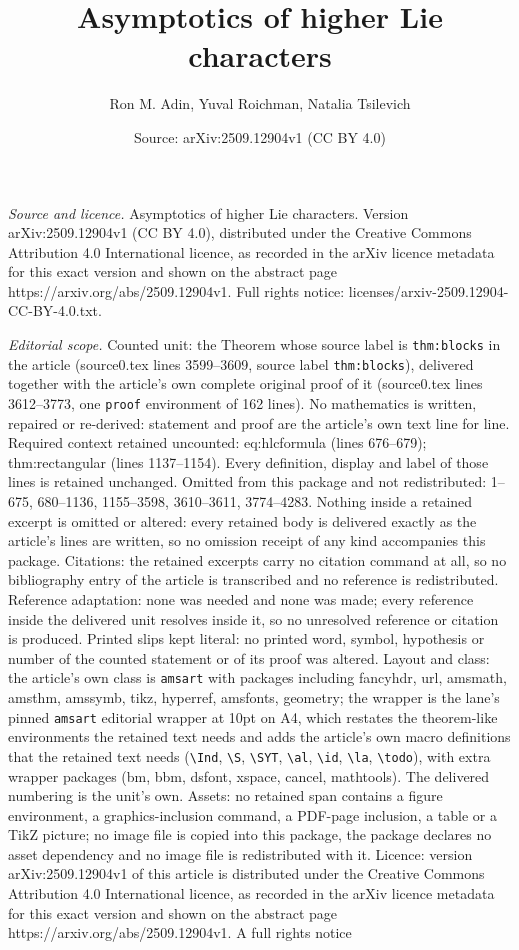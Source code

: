 \documentclass[10pt,a4paper]{amsart}
\title[Asymptotics of higher Lie characters]{Asymptotics of higher Lie characters}
\author{Ron M. Adin, Yuval Roichman, Natalia Tsilevich}
\date{Source: arXiv:2509.12904v1 (CC BY 4.0)}
\begin{document}
\maketitle

\noindent\emph{Source and licence.} Asymptotics of higher Lie characters. Version arXiv:2509.12904v1 (CC BY 4.0), distributed under the Creative Commons Attribution 4.0 International licence, as recorded in the arXiv licence metadata for this exact version and shown on the abstract page https://arxiv.org/abs/2509.12904v1. Full rights notice: licenses/arxiv-2509.12904-CC-BY-4.0.txt.\par\smallskip

\noindent\textit{Editorial scope.} Counted unit: the Theorem whose source label is \texttt{thm:blocks} in the article (source0.tex lines 3599--3609, source label \texttt{thm:blocks}), delivered together with the article's own complete original proof of it (source0.tex lines 3612--3773, one \texttt{proof} environment of 162 lines). No mathematics is written, repaired or re-derived: statement and proof are the article's own text line for line. Required context retained uncounted: eq:hlcformula (lines 676--679); thm:rectangular (lines 1137--1154). Every definition, display and label of those lines is retained unchanged. Omitted from this package and not redistributed: 1--675, 680--1136, 1155--3598, 3610--3611, 3774--4283. Nothing inside a retained excerpt is omitted or altered: every retained body is delivered exactly as the article's lines are written, so no omission receipt of any kind accompanies this package. Citations: the retained excerpts carry no citation command at all, so no bibliography entry of the article is transcribed and no reference is redistributed. Reference adaptation: none was needed and none was made; every reference inside the delivered unit resolves inside it, so no unresolved reference or citation is produced. Printed slips kept literal: no printed word, symbol, hypothesis or number of the counted statement or of its proof was altered. Layout and class: the article's own class is \texttt{amsart} with packages including fancyhdr, url, amsmath, amsthm, amssymb, tikz, hyperref, amsfonts, geometry; the wrapper is the lane's pinned \texttt{amsart} editorial wrapper at 10pt on A4, which restates the theorem-like environments the retained text needs and adds the article's own macro definitions that the retained text needs (\texttt{\textbackslash Ind}, \texttt{\textbackslash S}, \texttt{\textbackslash SYT}, \texttt{\textbackslash al}, \texttt{\textbackslash id}, \texttt{\textbackslash la}, \texttt{\textbackslash todo}), with extra wrapper packages (bm, bbm, dsfont, xspace, cancel, mathtools). The delivered numbering is the unit's own. Assets: no retained span contains a figure environment, a graphics-inclusion command, a PDF-page inclusion, a table or a TikZ picture; no image file is copied into this package, the package declares no asset dependency and no image file is redistributed with it. Licence: version arXiv:2509.12904v1 of this article is distributed under the Creative Commons Attribution 4.0 International licence, as recorded in the arXiv licence metadata for this exact version and shown on the abstract page https://arxiv.org/abs/2509.12904v1. A full rights notice 
\end{document}
